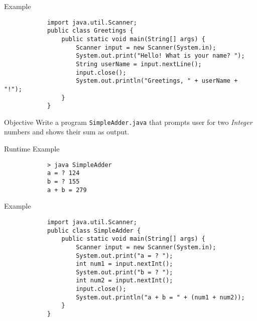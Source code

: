 \documentclass[10pt, compress]{beamer}
\begin{document}
\begin{slide}
	\begin{block}{Example}
		\begin{verbatim}
			import java.util.Scanner;
			public class Greetings {
			    public static void main(String[] args) {
			        Scanner input = new Scanner(System.in);
			        System.out.print("Hello! What is your name? ");
			        String userName = input.nextLine();
			        input.close();
			        System.out.println("Greetings, " + userName + "!");
			    }
			}
		\end{verbatim}
	\end{block}
\end{slide}

\begin{slide}
	\begin{block}{Objective}
		Write a program \texttt{SimpleAdder.java} that prompts user for two \textit{Integer} numbers and shows their sum as output.
	\end{block}
	\begin{block}{Runtime Example}
		\begin{verbatim}
			> java SimpleAdder
			a = ? 124
			b = ? 155
			a + b = 279
		\end{verbatim}
	\end{block}
\end{slide}

\begin{slide}
	\begin{block}{Example}
		\begin{verbatim}
			import java.util.Scanner;
			public class SimpleAdder {
			    public static void main(String[] args) {
			        Scanner input = new Scanner(System.in);
			        System.out.print("a = ? ");
			        int num1 = input.nextInt();
			        System.out.print("b = ? ");
			        int num2 = input.nextInt();
			        input.close();
			        System.out.println("a + b = " + (num1 + num2));
			    }
			}
		\end{verbatim}
	\end{block}
\end{slide}
\end{document}
